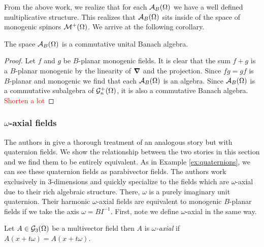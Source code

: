 From the above work, we realize that for each $\mathcal{A}_{B}(\Omega)$ we have a well defined multiplicative structure. This realizes that $\mathcal{A}_{B}(\Omega)$ sits inside of the space of monogenic spinors $\mathcal{M}^+(\Omega)$. We arrive at the following corollary.
\begin{corollary}
The space $\mathcal{A}_{B}(\Omega)$ is a commutative unital Banach algebra.
\end{corollary}
\begin{proof}
Let $f$ and $g$ be $B$-planar monogenic fields. It is clear that the sum $f+g$ is a $B$-planar monogenic by the linearity of $\boldsymbol{\nabla}$ and the projection. Since $fg=gf$ is $B$-planar and monogenic we find that each $\mathcal{A}_{B}(\Omega)$ is an algebra. Since $\mathcal{A}_{B}(\Omega)$ is a commutative subalgebra of $\mathcal{G}_n^+(\Omega)$, it is also a commutative Banach algebra. \textcolor{red}{Shorten a lot}
\end{proof}


\subsubsection{$\omega$-axial fields}
The authors in \cite{belishev_algebraic_2019,belishev_algebras_2019} give a thorough treatment of an analogous story but with quaternion fields.  We show the relationship between the two stories in this section and we find them to be entirely equivalent. As in Example \ref{ex:quaternions}, we can see these quaternion fields as parabivector fields.  The authors work exclusively in 3-dimensions and quickly specialize to the fields which are $\omega$-axial due to their rich algebraic structure. There, $\omega$ is a purely imaginary unit quaternion. Their harmonic $\omega$-axial fields are equivalent to monogenic $B$-planar fields if we take the axis $\omega = BI^{-1}$. First, note we define $\omega$-axial in the same way.
\begin{definition}
    Let $A \in \mathcal{G}_3(\Omega)$ be a multivector field then $A$ is \emph{$\omega$-axial} if $A(x+t\omega) = A(x+t\omega)$.  
\end{definition}

